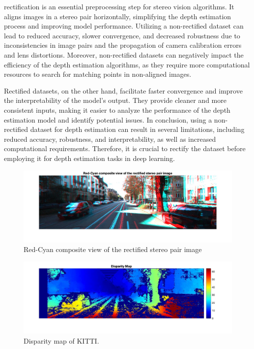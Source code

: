 \documentclass[english, LaM, oneside]{sapthesis}%
\begin{document}
rectification is an essential preprocessing step for stereo vision algorithms. It aligns images in a stereo pair horizontally, simplifying the depth estimation process and improving model performance. Utilizing a non-rectified dataset can lead to reduced accuracy, slower convergence, and decreased robustness due to inconsistencies in image pairs and the propagation of camera calibration errors and lens distortions. Moreover, non-rectified datasets can negatively impact the efficiency of the depth estimation algorithms, as they require more computational resources to search for matching points in non-aligned images.

Rectified datasets, on the other hand, facilitate faster convergence and improve the interpretability of the model's output. They provide cleaner and more consistent inputs, making it easier to analyze the performance of the depth estimation model and identify potential issues. In conclusion, using a non-rectified dataset for depth estimation can result in several limitations, including reduced accuracy, robustness, and interpretability, as well as increased computational requirements. Therefore, it is crucial to rectify the dataset before employing it for depth estimation tasks in deep learning.
\vspace{0.9cm}

\begin{figure}[h] %
    \centering
    \includegraphics[width=\linewidth]{Images/kitti_2.jpg}
    \caption{Red-Cyan composite view of the rectified stereo pair image}
    \label{fig:kitti_2}
\end{figure}

\begin{figure}[h] %
    \centering
    \includegraphics[width=\linewidth]{Images/kitti_disp.jpg}
    \caption{Disparity map of KITTI.}
    \label{fig:kitti_disp}
\end{figure}
\end{document}
